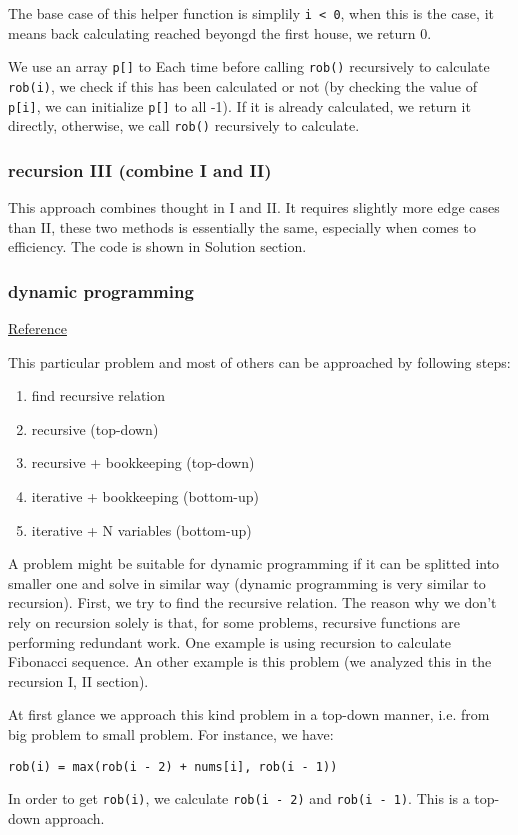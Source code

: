 \documentclass[12pt]{article}
\begin{document}
The base case of this helper function is simplily \texttt{i < 0}, when this is the case, it means back calculating reached beyongd the first house, we return 0.

We use an array \texttt{p[]} to Each time before calling \texttt{rob()} recursively to calculate \texttt{rob(i)}, we check if this has been calculated or not (by checking the value of \texttt{p[i]}, we can initialize \texttt{p[]} to all -1). If it is already calculated, we return it directly, otherwise, we call \texttt{rob()} recursively to calculate.
\subsubsection{recursion III (combine I and II)}
\label{sec:orgc74e251}
This approach combines thought in I and II. It requires slightly more edge cases than II, these two methods is essentially the same, especially when comes to efficiency. The code is shown in Solution section.
\subsubsection{dynamic programming}
\label{sec:org0fd7b80}
\href{https://leetcode.com/problems/house-robber/discuss/156523/From-good-to-great.-How-to-approach-most-of-DP-problems.}{Reference}

This particular problem and most of others can be approached by following steps:
\begin{enumerate}
\item find recursive relation
\item recursive (top-down)
\item recursive + bookkeeping (top-down)
\item iterative + bookkeeping (bottom-up)
\item iterative + N variables (bottom-up)
\end{enumerate}

A problem might be suitable for dynamic programming if it can be splitted into smaller one and solve in similar way (dynamic programming is very similar to recursion). First, we try to find the recursive relation. The reason why we don't rely on recursion solely is that, for some problems, recursive functions are performing redundant work. One example is using recursion to calculate Fibonacci sequence. An other example is this problem (we analyzed this in the recursion I, II section).

At first glance we approach this kind problem in a top-down manner, i.e. from big problem to small problem. For instance, we have:
\begin{verbatim}
rob(i) = max(rob(i - 2) + nums[i], rob(i - 1))
\end{verbatim}
In order to get \texttt{rob(i)}, we calculate \texttt{rob(i - 2)} and \texttt{rob(i - 1)}. This is a top-down approach.
\end{document}
